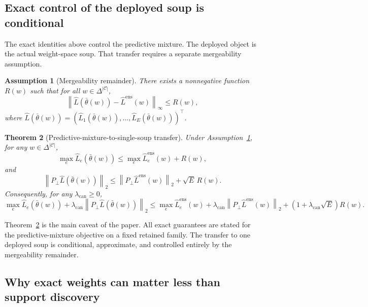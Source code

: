 \documentclass{article}
\newtheorem{theorem}{Theorem}[section]
\newtheorem{assumption}[theorem]{Assumption}
\theoremstyle{definition}
\newcommand{\cC}{\mathcal{C}}
\newcommand{\simplex}{\Delta}
\newcommand{\norm}[1]{\left\lVert #1 \right\rVert}
\newcommand{\paren}[1]{\left( #1 \right)}
\newcommand{\thetaw}{\bar{\theta}(w)}
\begin{document}
\subsection{Exact control of the deployed soup is conditional}

The exact identities above control the predictive mixture. The deployed object is the actual weight-space soup. That transfer requires a separate mergeability assumption.

\begin{assumption}[Mergeability remainder]
\label{ass:mergeability}
There exists a nonnegative function \(R(w)\) such that for all \(w\in\simplex^{|\cC|}\),
\begin{equation}
\norm{
\widehat L(\thetaw)-\widehat L^{\mathrm{ens}}(w)
}_\infty
\le
R(w),
\label{eq:mergeability_assumption}
\end{equation}
where \(\widehat L(\thetaw)=\paren{\widehat L_1(\thetaw),\dots,\widehat L_E(\thetaw)}^\top\).
\end{assumption}

\begin{theorem}[Predictive-mixture-to-single-soup transfer]
\label{thm:transfer}
Under Assumption~\ref{ass:mergeability}, for any \(w\in\simplex^{|\cC|}\),
\begin{equation}
\max_e \widehat L_e(\thetaw)
\le
\max_e \widehat L_e^{\mathrm{ens}}(w) + R(w),
\label{eq:max_transfer}
\end{equation}
and
\begin{equation}
\norm{P_\perp \widehat L(\thetaw)}_2
\le
\norm{P_\perp \widehat L^{\mathrm{ens}}(w)}_2 + \sqrt{E}\,R(w).
\label{eq:canal_transfer}
\end{equation}
Consequently, for any \(\lambda_{\mathrm{can}}\ge 0\),
\begin{equation}
\max_e \widehat L_e(\thetaw)
+ \lambda_{\mathrm{can}}\norm{P_\perp \widehat L(\thetaw)}_2
\le
\max_e \widehat L_e^{\mathrm{ens}}(w)
+ \lambda_{\mathrm{can}}\norm{P_\perp \widehat L^{\mathrm{ens}}(w)}_2
+ (1+\lambda_{\mathrm{can}}\sqrt{E})R(w).
\label{eq:objective_transfer}
\end{equation}
\end{theorem}

Theorem~\ref{thm:transfer} is the main caveat of the paper. All exact guarantees are stated for the predictive-mixture objective on a fixed retained family. The transfer to one deployed soup is conditional, approximate, and controlled entirely by the mergeability remainder.

\subsection{Why exact weights can matter less than support discovery}
\end{document}
